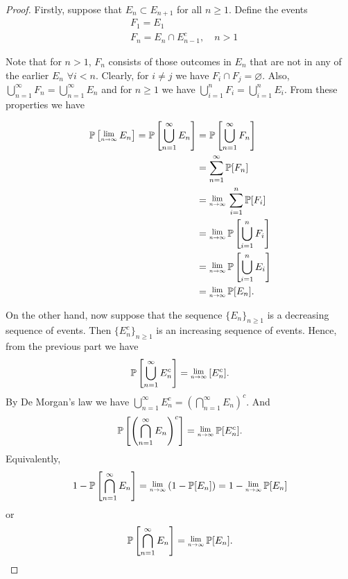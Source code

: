 \begin{proof}
    Firstly, suppose that $E_n \subset E_{n+1}$ for all $n \geq 1$. Define the events
    \begin{align*}
        &F_1 = E_1\\
        &F_n = E_n \cap E^c_{n-1}, \quad n > 1
    \end{align*}

    Note that for $n > 1$, $F_n$ consists of those outcomes in $E_n$ that are not in any of the earlier $E_n$
    $\forall i < n$. Clearly, for $i \neq j$ we have $F_i \cap F_j = \varnothing$. Also, 
    $\bigcup^\infty_{n=1} F_n = \bigcup^\infty_{n=1} E_n$ and for $n \geq 1$ we have 
    $\bigcup^n_{i=1} F_i = \bigcup^n_{i=1} E_i$. From these properties we have 

    \begin{align*}
        \mathbb{P}\left[ \Lim{n \to \infty} E_n \right] = \mathbb{P} \left[ \bigcup^\infty_{n=1} E_n \right]
        &= \mathbb{P} \left[ \bigcup^\infty_{n=1} F_n \right]\\
        &= \sum_{n=1}^{\infty} \mathbb{P}[F_n]\\
        &= \Lim{n \to \infty} \sum^n_{i=1} \mathbb{P}[F_i]\\
        &= \Lim{n \to \infty} \mathbb{P} \left[ \bigcup^n_{i=1} F_i \right]\\
        &= \Lim{n \to \infty} \mathbb{P} \left[ \bigcup^n_{i=1} E_i \right]\\
        &= \Lim{n \to \infty} \mathbb{P}[E_n].
    \end{align*}

    On the other hand, now suppose that the sequence $\{E_n \}_{n \geq 1}$ is a decreasing sequence of events. Then 
    $\{ E^c_{n}\}_{n \geq 1}$ is an increasing sequence of events. Hence, from the previous part we have 
    \[
        \mathbb{P} \left[ \bigcup^\infty_{n=1} E^c_{n} \right] = \Lim{n \to \infty}[E^c_n].
    \] 
    By De Morgan's law we have $\bigcup^\infty_{n=1} E^c_n = \left( \bigcap^\infty_{n=1} E_n \right)^c$. And  
    \[
        \mathbb{P} \left[ \left( \bigcap^\infty_{n=1} E_n \right)^c \right] = \Lim{n \to \infty} \mathbb{P}[E^c_n].
    \]
    Equivalently,
    \[
        1 - \mathbb{P}\left[ \bigcap^\infty_{n=1} E_n \right] = \Lim{n \to \infty} (1 - \mathbb{P}[E_n])
        = 1 - \Lim{n \to \infty}\mathbb{P}[E_n]
    \]
    or 
    \[
        \mathbb{P}\left[ \bigcap^\infty_{n=1} E_n \right] = \Lim{n \to \infty} \mathbb{P}[E_n].
    \]
\end{proof}


